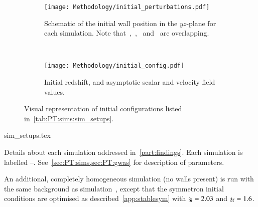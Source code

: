     \begin{figure}[ht]
        \centering
        \begin{subfigure}[t]{0.62\linewidth}
            \centering
            \texttt{[image: Methodology/initial\_perturbations.pdf]}
            \caption{Schematic of the initial wall position in the $yz$-plane for each simulation. Note that~,~,~ and~ are overlapping.} %
            \label{fig:PT:sims:intital_perturbations}
        \end{subfigure}
        ~
        \begin{subfigure}[t]{0.32\linewidth}
            \centering
            \texttt{[image: Methodology/initial\_config.pdf]}
            \caption{Initial redshift, and asymptotic scalar and velocity field values.}
            \label{fig:PT:sims:initial_config}
        \end{subfigure}
        \caption{Visual representation of initial configurations listed in~\cref{tab:PT:sims:sim_setups}.}
        \label{fig:PT:sims:initial_configs}
    \end{figure}


    \begin{table}[h]
        {sim_setups.tex}
        \caption{Details about each simulation addressed in~\cref{part:findings}. Each simulation is labelled --. See~\cref{sec:PT:sims,sec:PT:gwas} for description of parameters.} %
        \label{tab:PT:sims:sim_setups}
    \end{table}



    An additional, completely homogeneous simulation (no walls present) is run with the same background as simulation~, except that the symmetron initial conditions are optimised as described~\cref{app:stablesym} with $\mathfrak{z}_\mathrm{i}=2.03$ and $\mathfrak{z}_\mathrm{f}=1.6$. %
    
    




